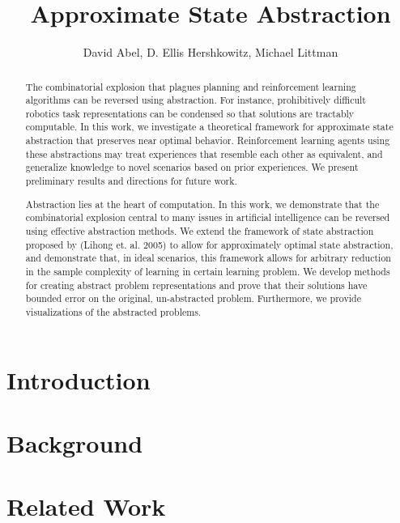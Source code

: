 \documentclass[11pt]{article}
\title{Approximate State Abstraction}
\author{David Abel, D. Ellis Hershkowitz, Michael Littman}
\date{}                                           %
\begin{document}
\maketitle


\begin{abstract}
The combinatorial explosion that plagues planning and reinforcement learning algorithms can be reversed using abstraction. For instance, prohibitively difficult robotics task representations can be condensed so that solutions are tractably computable. In this work, we investigate a theoretical framework for approximate state abstraction that preserves near optimal behavior. Reinforcement learning agents using these abstractions may treat experiences that resemble each other as equivalent, and generalize knowledge to novel scenarios based on prior experiences. We present preliminary results and directions for future work.

Abstraction lies at the heart of computation. In this work, we demonstrate that the combinatorial explosion central to many issues in artificial intelligence can be reversed using effective abstraction methods. We extend the framework of state abstraction proposed by (Lihong et. al. 2005) to allow for approximately optimal state abstraction, and demonstrate that, in ideal scenarios, this framework allows for arbitrary reduction in the sample complexity of learning in certain learning problem. We develop methods for creating abstract problem representations and prove that their solutions have bounded error on the original, un-abstracted problem. Furthermore, we provide visualizations of the abstracted problems.

\end{abstract}



\section{Introduction}


\section{Background}


\section{Related Work}
\end{document}
